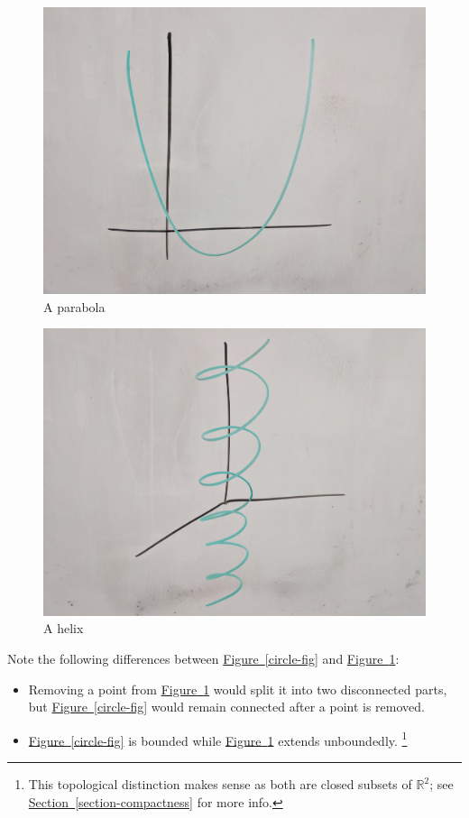 \documentclass[10pt,]{article}
\begin{document}
\begin{figure}
\centering
\includegraphics[width=1\linewidth]{images/parabola.jpg}
\caption{A parabola\label{figure-parabola}}
\end{figure}
\begin{figure}
\centering
\includegraphics[width=1\linewidth]{images/helix.jpg}
\caption{A helix\label{figure-helix}}
\end{figure}
\hypertarget{p-8}{}%
Note the following differences between \hyperref[circle-fig]{Figure~\ref{circle-fig}} and \hyperref[figure-parabola]{Figure~\ref{figure-parabola}}:%
\leavevmode%
\begin{itemize}[label=\textbullet]
\item{}Removing a point from \hyperref[figure-parabola]{Figure~\ref{figure-parabola}} would split it into two disconnected parts, but \hyperref[circle-fig]{Figure~\ref{circle-fig}} would remain connected after a point is removed.%
\item{}\hyperref[circle-fig]{Figure~\ref{circle-fig}} is bounded while \hyperref[figure-parabola]{Figure~\ref{figure-parabola}} extends unboundedly. \footnote{This topological distinction makes sense as both are closed subsets of \(\mathbb R^2\); see \hyperref[section-compactness]{Section~\ref{section-compactness}} for more info.\label{fn-1}}%
\end{itemize}
\end{document}
